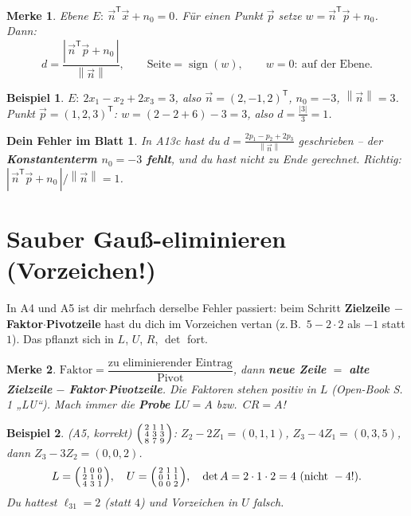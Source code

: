 \documentclass[a4paper,11pt]{article}
\newenvironment{psmallmatrix}{\left(\begin{smallmatrix}}{\end{smallmatrix}\right)}
\newcommand{\transp}{^{\mathsf{T}}}
\newcommand{\norm}[1]{\left\lVert #1 \right\rVert}
\theoremstyle{def0}
\newtheorem*{merke}{\textcolor{good}{Merke}}
\newtheorem*{fehler}{\textcolor{bad}{Dein Fehler im Blatt}}
\newtheorem*{bsp}{Beispiel}
\begin{document}
\begin{merke}
Ebene $E:\ \vec n\transp\vec x + n_0 = 0$. Für einen Punkt $\vec p$ setze
$w=\vec n\transp\vec p + n_0$. Dann:
\[
d=\frac{|\,\vec n\transp\vec p + n_0\,|}{\norm{\vec n}},\qquad
\text{Seite}=\operatorname{sign}(w),\qquad w=0:\ \text{auf der Ebene.}
\]
\end{merke}

\begin{bsp}
$E:\ 2x_1-x_2+2x_3=3$, also $\vec n=(2,-1,2)\transp$, $n_0=-3$, $\norm{\vec n}=3$.
Punkt $\vec p=(1,2,3)\transp$:\;
$w=(2-2+6)-3=3$, also $d=\tfrac{|3|}{3}=1$.
\end{bsp}

\begin{fehler}
In A13c hast du $d=\tfrac{2p_1-p_2+2p_3}{\norm{\vec n}}$ geschrieben -- der
\textbf{Konstantenterm $n_0=-3$ fehlt}, und du hast nicht zu Ende gerechnet. Richtig:
$|\,\vec n\transp\vec p + n_0\,|/\norm{\vec n}=1$.
\end{fehler}

\section{Sauber Gauß-eliminieren (Vorzeichen!)}

In A4 und A5 ist dir mehrfach derselbe Fehler passiert: beim Schritt
\textbf{Zielzeile $-$ Faktor$\cdot$Pivotzeile} hast du dich im Vorzeichen vertan
(z.\,B.\ $5-2\cdot2$ als $-1$ statt $1$). Das pflanzt sich in $L$, $U$, $R$, $\det$ fort.

\begin{merke}
$\text{Faktor}=\dfrac{\text{zu eliminierender Eintrag}}{\text{Pivot}}$, dann
\textbf{neue Zeile} $=$ \textbf{alte Zielzeile} $-$ \textbf{Faktor}$\cdot$\textbf{Pivotzeile}.
Die Faktoren stehen \emph{positiv} in $L$ (Open-Book S.\,1 „LU“).
Mach immer die \textbf{Probe} $LU=A$ bzw.\ $CR=A$!
\end{merke}

\begin{bsp}(A5, korrekt)
$\begin{psmallmatrix}2&1&1\\4&3&3\\8&7&9\end{psmallmatrix}$:
$Z_2-2Z_1=(0,1,1)$, $Z_3-4Z_1=(0,3,5)$, dann $Z_3-3Z_2=(0,0,2)$.
\[
L=\begin{psmallmatrix}1&0&0\\2&1&0\\4&3&1\end{psmallmatrix},\quad
U=\begin{psmallmatrix}2&1&1\\0&1&1\\0&0&2\end{psmallmatrix},\quad
\det A = 2\cdot1\cdot2 = 4\ (\text{nicht } -4!).
\]
Du hattest $\ell_{31}=2$ (statt $4$) und Vorzeichen in $U$ falsch.
\end{bsp}
\end{document}
